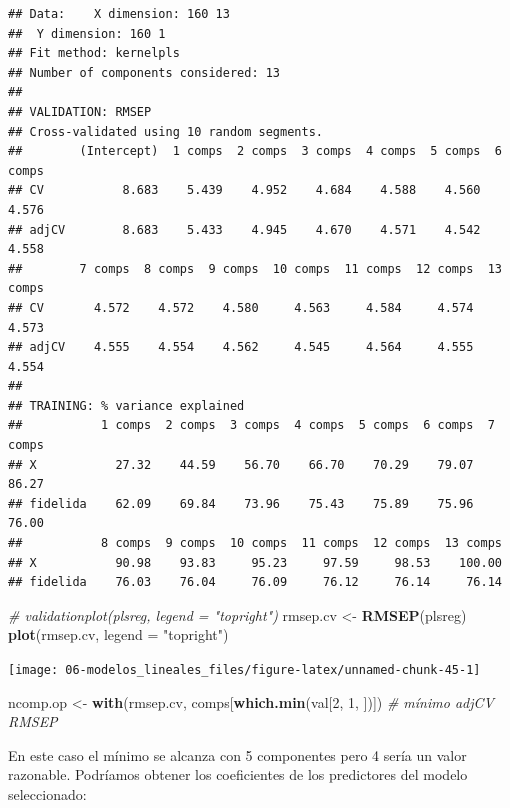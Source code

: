 \documentclass[
]{book}
\newenvironment{Shaded}{\begin{snugshade}}{\end{snugshade}}
\newcommand{\CommentTok}[1]{\textcolor[rgb]{0.56,0.35,0.01}{\textit{#1}}}
\newcommand{\DataTypeTok}[1]{\textcolor[rgb]{0.13,0.29,0.53}{#1}}
\newcommand{\DecValTok}[1]{\textcolor[rgb]{0.00,0.00,0.81}{#1}}
\newcommand{\KeywordTok}[1]{\textcolor[rgb]{0.13,0.29,0.53}{\textbf{#1}}}
\newcommand{\NormalTok}[1]{#1}
\newcommand{\StringTok}[1]{\textcolor[rgb]{0.31,0.60,0.02}{#1}}
\theoremstyle{break}
\theoremstyle{definition}
\theoremstyle{definition}
\theoremstyle{definition}
\theoremstyle{remark}
\begin{document}
\begin{verbatim}
## Data:    X dimension: 160 13 
##  Y dimension: 160 1
## Fit method: kernelpls
## Number of components considered: 13
## 
## VALIDATION: RMSEP
## Cross-validated using 10 random segments.
##        (Intercept)  1 comps  2 comps  3 comps  4 comps  5 comps  6 comps
## CV           8.683    5.439    4.952    4.684    4.588    4.560    4.576
## adjCV        8.683    5.433    4.945    4.670    4.571    4.542    4.558
##        7 comps  8 comps  9 comps  10 comps  11 comps  12 comps  13 comps
## CV       4.572    4.572    4.580     4.563     4.584     4.574     4.573
## adjCV    4.555    4.554    4.562     4.545     4.564     4.555     4.554
## 
## TRAINING: % variance explained
##           1 comps  2 comps  3 comps  4 comps  5 comps  6 comps  7 comps
## X           27.32    44.59    56.70    66.70    70.29    79.07    86.27
## fidelida    62.09    69.84    73.96    75.43    75.89    75.96    76.00
##           8 comps  9 comps  10 comps  11 comps  12 comps  13 comps
## X           90.98    93.83     95.23     97.59     98.53    100.00
## fidelida    76.03    76.04     76.09     76.12     76.14     76.14
\end{verbatim}

\begin{Shaded}
\begin{Highlighting}[]
\CommentTok{# validationplot(plsreg, legend = "topright")}
\NormalTok{rmsep.cv <-}\StringTok{ }\KeywordTok{RMSEP}\NormalTok{(plsreg)}
\KeywordTok{plot}\NormalTok{(rmsep.cv, }\DataTypeTok{legend =} \StringTok{"topright"}\NormalTok{)}
\end{Highlighting}
\end{Shaded}

\begin{center}\texttt{[image: 06-modelos\_lineales\_files/figure-latex/unnamed-chunk-45-1]} \end{center}

\begin{Shaded}
\begin{Highlighting}[]
\NormalTok{ncomp.op <-}\StringTok{ }\KeywordTok{with}\NormalTok{(rmsep.cv, comps[}\KeywordTok{which.min}\NormalTok{(val[}\DecValTok{2}\NormalTok{, }\DecValTok{1}\NormalTok{, ])]) }\CommentTok{# mínimo adjCV RMSEP}
\end{Highlighting}
\end{Shaded}

En este caso el mínimo se alcanza con 5 componentes pero 4 sería un valor razonable.
Podríamos obtener los coeficientes de los predictores del modelo seleccionado:
\end{document}
